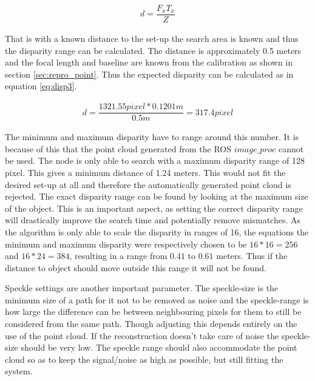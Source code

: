 \begin{equation}\label{eq:disp2}
\begin{split}
 d = \dfrac{F_{x}T_{x}}{ Z}
\end{split}
\end{equation} 

That is with a known distance to the set-up the search area is known and thus the disparity range can be calculated. The distance is approximately 0.5 meters and the focal length and baseline are known from the calibration as shown in section \ref{sec:repro_point}. Thus the expected disparity can be calculated as in equation \ref{eq:disp3}.

\begin{equation}\label{eq:disp3}
\begin{split}
d = \dfrac{1321.55 pixel*0.1201m}{0.5m} = 317.4 pixel
\end{split}
\end{equation}

The minimum and maximum disparity have to range around this number. It is because of this that the point cloud generated from the ROS $image\_proc$ cannot be used. The node is only able to search with a maximum disparity range of 128 pixel. This gives a minimum distance of 1.24 meters. This would not fit the desired set-up at all and therefore the automatically generated point cloud is rejected. The exact disparity range can be found by looking at the maximum size of the object. This is an important aspect, as setting the correct disparity range will drastically improve the search time and potentially remove mismatches. As the algorithm is only able to scale the disparity in ranges of 16, the equations the minimum and maximum disparity were respectively chosen to be $16*16=256$ and $16*24=384$, resulting in a range from $0.41$ to $0.61$ meters. Thus if the distance to object should move outside this range it will not be found.

Speckle settings are another important parameter. The speckle-size is the minimum size of a path for it not to be removed as noise and the speckle-range is how large the difference can be between neighbouring pixels for them to still be considered from the same path. Though adjusting this depends entirely on the use of the point cloud. If the reconstruction doesn't take care of noise the speckle-size should be very low. The speckle range should also accommodate the point cloud so as to keep the signal/noise as high as possible, but still fitting the system. 

